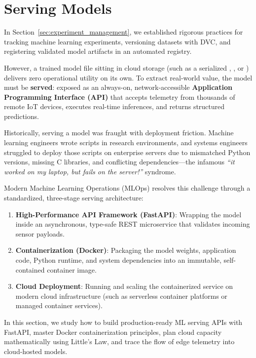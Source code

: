 \section{Serving Models}\label{sec:serving_models}

In Section~\ref{sec:experiment_management}, we established rigorous practices for tracking machine learning experiments, versioning datasets with DVC, and registering validated model artifacts in an automated registry.

However, a trained model file sitting in cloud storage (such as a serialized , , or ) delivers zero operational utility on its own. To extract real-world value, the model must be \textbf{served}: exposed as an always-on, network-accessible \textbf{Application Programming Interface (API)} that accepts telemetry from thousands of remote IoT devices, executes real-time inferences, and returns structured predictions.

Historically, serving a model was fraught with deployment friction. Machine learning engineers wrote scripts in research environments, and systems engineers struggled to deploy those scripts on enterprise servers due to mismatched Python versions, missing C libraries, and conflicting dependencies---the infamous \emph{``it worked on my laptop, but fails on the server!''} syndrome.

Modern Machine Learning Operations (MLOps) resolves this challenge through a standardized, three-stage serving architecture:
\begin{enumerate}
    \item \textbf{High-Performance API Framework (FastAPI)}: Wrapping the model inside an asynchronous, type-safe REST microservice that validates incoming sensor payloads.
    \item \textbf{Containerization (Docker)}: Packaging the model weights, application code, Python runtime, and system dependencies into an immutable, self-contained container image.
    \item \textbf{Cloud Deployment}: Running and scaling the containerized service on modern cloud infrastructure (such as serverless container platforms or managed container services).
\end{enumerate}

In this section, we study how to build production-ready ML serving APIs with FastAPI, master Docker containerization principles, plan cloud capacity mathematically using Little's Law, and trace the flow of edge telemetry into cloud-hosted models.

